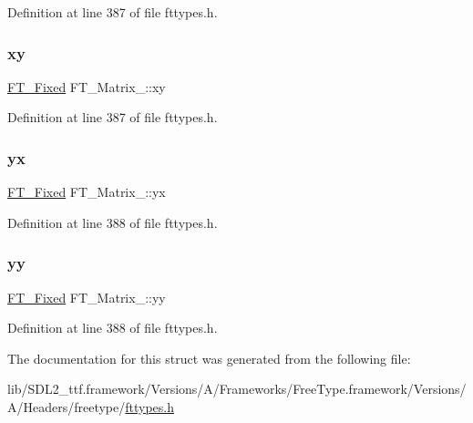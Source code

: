 Definition at line 387 of file fttypes.\+h.

\mbox{\label{struct_f_t___matrix___a7e9f439d37c00ba1a11919bcaa8937a2}} 
\subsubsection{\texorpdfstring{xy}{xy}}
{\footnotesize\ttfamily \mbox{\hyperlink{fttypes_8h_a5f5a679cc09f758efdd0d1c5feed3c3d}{F\+T\+\_\+\+Fixed}} F\+T\+\_\+\+Matrix\+\_\+\+::xy}



Definition at line 387 of file fttypes.\+h.

\mbox{\label{struct_f_t___matrix___a55792583a843a1611b43c40534a02a17}} 
\subsubsection{\texorpdfstring{yx}{yx}}
{\footnotesize\ttfamily \mbox{\hyperlink{fttypes_8h_a5f5a679cc09f758efdd0d1c5feed3c3d}{F\+T\+\_\+\+Fixed}} F\+T\+\_\+\+Matrix\+\_\+\+::yx}



Definition at line 388 of file fttypes.\+h.

\mbox{\label{struct_f_t___matrix___a689a6fd20a88238788b90c3597ee0c2a}} 
\subsubsection{\texorpdfstring{yy}{yy}}
{\footnotesize\ttfamily \mbox{\hyperlink{fttypes_8h_a5f5a679cc09f758efdd0d1c5feed3c3d}{F\+T\+\_\+\+Fixed}} F\+T\+\_\+\+Matrix\+\_\+\+::yy}



Definition at line 388 of file fttypes.\+h.



The documentation for this struct was generated from the following file\+:\begin{DoxyCompactItemize}
\item 
lib/\+S\+D\+L2\+\_\+ttf.\+framework/\+Versions/\+A/\+Frameworks/\+Free\+Type.\+framework/\+Versions/\+A/\+Headers/freetype/\mbox{\hyperlink{fttypes_8h}{fttypes.\+h}}\end{DoxyCompactItemize}
